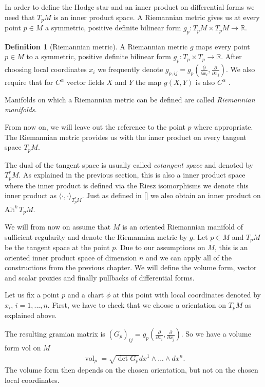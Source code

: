 \documentclass[12pt,a4paper]{article}
\numberwithin{equation}{subsection}
\numberwithin{lemma}{subsection}
\theoremstyle{definition}
\newtheorem{definition}[lemma]{Definition}
\DeclareMathOperator{\vol}{vol}
\newcommand{\alternating}[2]{ {\text{Alt}^{#1}\,#2} }
\newcommand{\real}{\mathbb{R}}
\begin{document}
In order to define the Hodge star and an inner product on differential forms
we need that 
$T_p M$ is an inner product space.
A Riemannian metric gives us at every point $p \in M$ 
a symmetric, positive definite bilinear form 
$g_p: T_p M \times T_p M \rightarrow \real$. 
\begin{definition}[Riemannian metric]
    A Riemannian metric $g$ maps every point $p\in M$ to 
    a symmetric, positive definite bilinear form $g_p: T_p \times T_p \rightarrow \real$.
    After choosing local coordinates $x_i$ we frequently denote 
    $g_{p,ij} = g_p(\frac{\partial}{\partial x_i}, \frac{\partial}{\partial x_j})$.
    We also require that for $C^\alpha$ vector fields $X$ and $Y$ the map 
    $g(X,Y)$ is also $C^\alpha$ . 

    Manifolds on which a Riemannian metric can be defined are called 
    \textit{Riemannian manifolds}.
\end{definition}
From now on, we will leave out the reference to the point $p$ where appropriate.
The Riemannian metric provides us with the 
inner product on every tangent space $T_p M$. 

The dual of the tangent space is usually called \textit{cotangent space} and 
denoted by $T^*_p M$. As explained in the previous section, this is also a 
inner product space where the inner product is defined via the Riesz isomorphisms
we denote this inner product as $\langle \cdot, \cdot \rangle _{T^*_p M}$.
Just as defined in \ref{} we also obtain an inner product on 
$\alternating{k}{T_p M}$.

We will from now on assume that $M$ is an oriented Riemannian manifold of sufficient 
regularity and denote the Riemannian metric by $g$.
Let $p \in M$ and $T_p M$ be the tangent space at the point $p$. 
Due to our assumptions on $M$, this is an oriented inner product space of 
dimension $n$ and we can apply 
all of the constructions from the previous chapter. 
We will define the volume form, vector and scalar proxies and finally pullbacks
of differential forms.

Let us fix a point $p$ and a chart $\phi$ 
at this point with local coordinates denoted by $x_i$, $i=1,...,n$. 
First, we have to check that we choose a orientation on $T_p M$ as explained 
above.

The resulting gramian matrix is
$(G_p)_{ij} = g_p(\frac{\partial}{\partial x_i},\frac{\partial}{\partial x_j})$.
So we have a volume form vol on $M$ 
\begin{align*}
    \vol_p = \sqrt{\det G_p} dx^1 \wedge ... \wedge dx^n.
\end{align*}
The volume form then depends on the chosen orientation, but not on the 
chosen local coordinates.
\end{document}
